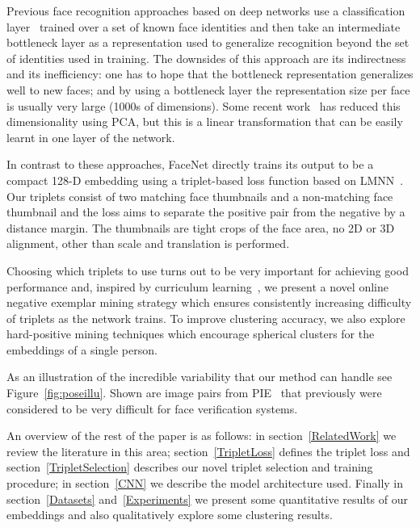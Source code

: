\documentclass[10pt,twocolumn,letterpaper]{article}
\begin{document}
Previous face recognition approaches based on deep networks use a
classification layer~\cite{deepid2plus,deepface} trained over a set of known
face identities and then take an intermediate bottleneck layer as a
representation used to generalize recognition beyond the set of identities used
in training.  The downsides of this approach are its indirectness and its
inefficiency: one has to hope that the bottleneck representation generalizes
well to new faces; and by using a bottleneck layer the representation size per
face is usually very large (1000s of dimensions). Some recent
work~\cite{deepid2plus} has reduced this dimensionality using PCA, but this is
a linear transformation that can be easily learnt in one layer of the network.

In contrast to these approaches, FaceNet directly trains its output to be a
compact \mbox{128-D} embedding using a triplet-based loss function based on
LMNN~\cite{Weinberger06distancemetric}.  Our triplets consist of two matching
face thumbnails and a non-matching face thumbnail and the loss aims to separate
the positive pair from the negative by a distance margin. The thumbnails are
tight crops of the face area, no 2D or 3D alignment, other than scale and
translation is performed.

Choosing which triplets to use turns
out to be very important for achieving good performance and, inspired by
curriculum learning~\cite{Bengio2009Curriculum}, we present a novel online
negative exemplar mining strategy which ensures consistently increasing
difficulty of triplets as the network trains.  To improve
clustering accuracy, we also explore hard-positive mining techniques which
encourage spherical clusters for the embeddings of a single person.

As an illustration of the incredible variability that our method can handle see
Figure~\ref{fig:poseillu}.  Shown are image pairs from PIE~\cite{pie} that
previously were considered to be very difficult for face verification systems.

An overview of the rest of the paper is as follows: in
section~\ref{RelatedWork} we review the literature in this area;
section~\ref{TripletLoss} defines the triplet loss and
section~\ref{TripletSelection} describes our novel triplet selection and
training procedure; in section~\ref{CNN} we describe the model architecture
used.  Finally in section~\ref{Datasets} and~\ref{Experiments} we present some
quantitative results of our embeddings and also qualitatively explore some
clustering results.
\end{document}
